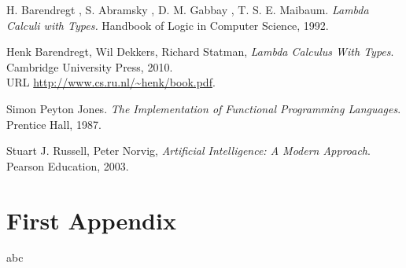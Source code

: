 \documentclass[12pt,a4paper]{report}
\begin{document}
\begin{thebibliography}{9}
H. Barendregt , S. Abramsky , D. M. Gabbay , T. S. E. Maibaum.
\emph{Lambda Calculi with Types.} 
Handbook of Logic in Computer Science, 1992. 


  Henk Barendregt, Wil Dekkers, Richard Statman,
  \emph{Lambda Calculus With Types}.
  Cambridge University Press,
  2010. \\
  URL \url{http://www.cs.ru.nl/~henk/book.pdf}.

Simon Peyton Jones. 
\emph{The Implementation of Functional Programming Languages}. 
Prentice Hall, 1987.


	Stuart J. Russell, Peter Norvig,
	\emph{Artificial Intelligence: A Modern Approach}.
	Pearson Education,
	2003. 

\end{thebibliography}


\appendix
\chapter{First Appendix}

abc
	
	
\end{document}
